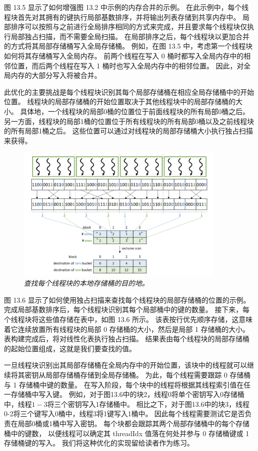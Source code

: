 图 13.5 显示了如何增强图 13.2 中示例的内存合并的示例。 
在此示例中，每个线程块首先对其拥有的键执行局部基数排序，并将输出列表存储到共享内存中。 
局部排序可以按照与之前进行全局排序相同的方式来完成，并且要求每个线程块仅执行局部独占扫描，而不需要全局扫描。 
在局部排序之后，每个线程块以更加合并的方式将其局部存储桶写入全局存储桶。 
例如，在图 13.5 中，考虑第一个线程块如何将其存储桶写入全局内存。 
前两个线程在写入 0 桶时都写入全局内存中的相邻位置，而后两个线程在写入 1 桶时也写入全局内存中的相邻位置。 
因此，对全局内存的大部分写入将被合并。

此优化的主要挑战是每个线程块识别其每个局部存储桶在相应全局存储桶中的开始位置。 
线程块的局部存储桶的开始位置取决于其他线程块中的局部存储桶的大小。 
具体地，一个线程块的局部0桶的位置位于前面线程块的所有局部0桶之后。 
另一方面，线程块的局部1桶的位置位于所有线程块的所有局部0桶以及之前线程块的所有局部1桶之后。 
这些位置可以通过对线程块的局部存储桶大小执行独占扫描来获得。

\begin{figure}[H]
	\centering
	\includegraphics[width=0.9\textwidth]{figs/F13.6.png}
	\caption{\textit{查找每个线程块的本地存储桶的目的地。}}
\end{figure}

图 13.6 显示了如何使用独占扫描来查找每个线程块的局部存储桶的位置的示例。 
完成局部基数排序后，每个线程块识别其每个局部桶中的键的数量。 接下来，每个线程块将这些值存储在表中，如图 13.6 所示。 
该表按行优先顺序存储，这意味着它连续放置所有线程块的局部 0 存储桶的大小，然后是局部 1 存储桶的大小。 
表构建完成后，将对线性化表执行独占扫描。 结果表由每个线程块的局部存储桶的起始位置组成，这就是我们要查找的值。

一旦线程块识别出其局部存储桶在全局内存中的开始位置，该块中的线程就可以继续将其密钥从局部存储桶存储到全局存储桶。 
为此，每个线程需要跟踪 0 存储桶与 1 存储桶中键的数量。 在写入阶段，每个块中的线程将根据其线程索引值在任一存储桶中写入键。 
例如，对于图13.6中的块2，线程0将单个密钥写入0存储桶中，线程$1-3$将三个密钥写入1存储桶中。 
相比之下，对于图13.6中的块3，线程0-2将三个键写入0桶中，线程3将1键写入1桶中。 
因此每个线程需要测试它是否负责在局部0桶或1桶中写入密钥。 
每个块都会跟踪其两个局部存储桶中的每个存储桶中的键数，
以便线程可以确定其 threadIdx 值落在何处并参与 0 存储桶键或 1 存储桶键的写入。 我们将这种优化的实现留给读者作为练习。

